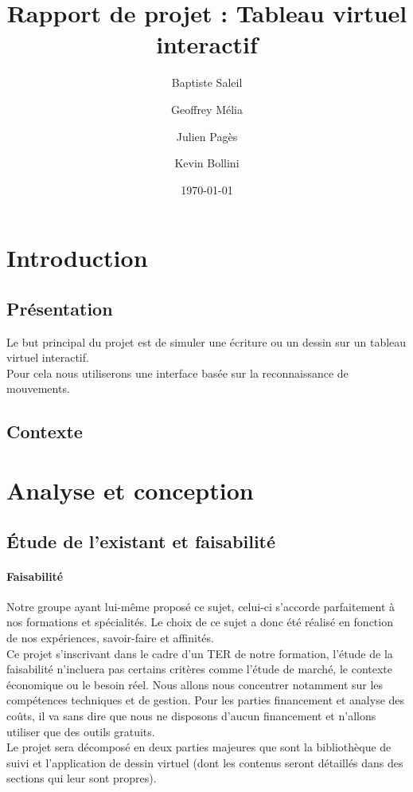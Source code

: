 \documentclass{report}
\title{Rapport de projet : Tableau virtuel interactif}
\author{Baptiste Saleil \and Geoffrey Mélia \and Julien Pagès \and Kevin Bollini}
\date{\today}
\begin{document}
	\maketitle
	\thispagestyle{empty}
	\newpage
	
	\tableofcontents

	\listoffigures
	
	\newpage
	\chapter{Introduction}
		\section{Présentation}
		Le but principal du projet est de simuler une écriture ou un dessin sur un tableau virtuel interactif. \\
		Pour cela nous utiliserons une interface basée sur la reconnaissance de mouvements.
		
		\section{Contexte}
	
	\chapter{Analyse et conception}
		\section{Étude de l'existant et faisabilité}
		\subsubsection{Faisabilité}
		Notre groupe ayant lui-même proposé ce sujet, celui-ci s'accorde parfaitement à nos formations et spécialités. Le choix de ce sujet a donc été réalisé en fonction de nos expériences, savoir-faire et affinités.\\
Ce projet s'inscrivant dans le cadre d'un TER de notre formation, l'étude de la faisabilité n'incluera pas certains critères comme l'étude de marché, le contexte économique ou le besoin réel. 
Nous allons nous concentrer notamment sur les compétences techniques et de gestion. Pour les parties financement et analyse des coûts, il va sans dire que nous ne disposons d'aucun financement et n'allons utiliser que des outils gratuits. \\
Le projet sera décomposé en deux parties majeures que sont la bibliothèque de suivi et l'application de dessin virtuel (dont les contenus seront détaillés dans des sections qui leur sont propres).
\end{document}
